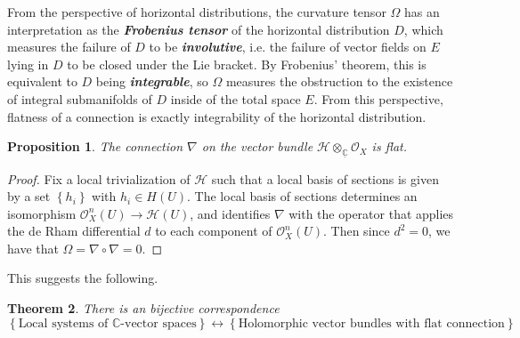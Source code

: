 \documentclass[psamsfonts, 12pt]{amsart}
\newtheorem{thm}{Theorem}[section]
\newtheorem{prop}[thm]{Proposition}
\theoremstyle{definition}
\theoremstyle{remark}
\renewcommand{\O}{\mathcal{O}}
\newcommand{\ib}[1]{\textbf{\textit{#1}}}
\newcommand{\C}{\mathbb{C}}
\newcommand{\set}[1]{\left\lbrace #1 \right\rbrace}
\begin{document}
From the perspective of horizontal distributions, the curvature tensor $\Omega$
has an interpretation as the \ib{Frobenius tensor} of the horizontal distribution $D$,
which measures the failure of $D$ to be \ib{involutive}, i.e. the failure of vector
fields on $E$ lying in $D$ to be closed under the Lie bracket. By Frobenius' theorem,
this is equivalent to $D$ being \ib{integrable}, so $\Omega$ measures the obstruction
to the existence of integral submanifolds of $D$ inside of the total space $E$.
From this perspective, flatness of a connection is exactly integrability of
the horizontal distribution.
%
\begin{prop}
The connection $\nabla$ on the vector bundle $\mathcal{H} \otimes_{\underline{\C}}\O_X$
is flat.
\end{prop}
%
\begin{proof}
Fix a local trivialization of $\mathcal{H}$ such that a local basis of sections
is given by a set $\set{h_i}$ with $h_i \in H(U)$. The local
basis of sections determines an isomorphism $\O_X^n(U) \to \mathcal{H}(U)$,
and identifies $\nabla$ with the operator that applies the de Rham differential $d$
to each component of $\O_X^n(U)$. Then since $d^2 = 0 $, we have that
$\Omega = \nabla\circ\nabla = 0$.
\end{proof}
%
This suggests the following.
%
\begin{thm}
There is an bijective correspondence
\[
\set{\text{Local systems of } \C \text{-vector spaces}} \longleftrightarrow
\set{\text{Holomorphic vector bundles with flat connection}}
\]
\end{thm}
%
\end{document}
